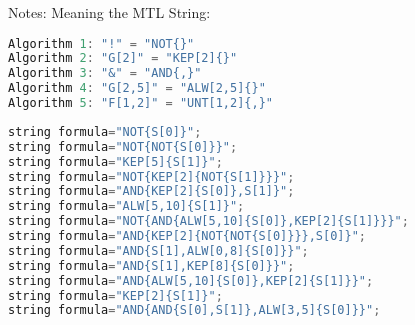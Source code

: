 Notes: Meaning the MTL String:
\begin{lstlisting}[language=C]
Algorithm 1: "!" = "NOT{}"
Algorithm 2: "G[2]" = "KEP[2]{}"
Algorithm 3: "&" = "AND{,}"
Algorithm 4: "G[2,5]" = "ALW[2,5]{}"
Algorithm 5: "F[1,2]" = "UNT[1,2]{,}"
\end{lstlisting}

\begin{lstlisting}[language=C]
string formula="NOT{S[0]}";
string formula="NOT{NOT{S[0]}}";
string formula="KEP[5]{S[1]}";
string formula="NOT{KEP[2]{NOT{S[1]}}}";
string formula="AND{KEP[2]{S[0]},S[1]}";
string formula="ALW[5,10]{S[1]}";
string formula="NOT{AND{ALW[5,10]{S[0]},KEP[2]{S[1]}}}";
string formula="AND{KEP[2]{NOT{NOT{S[0]}}},S[0]}";
string formula="AND{S[1],ALW[0,8]{S[0]}}";
string formula="AND{S[1],KEP[8]{S[0]}}";
string formula="AND{ALW[5,10]{S[0]},KEP[2]{S[1]}}";
string formula="KEP[2]{S[1]}";
string formula="AND{AND{S[0],S[1]},ALW[3,5]{S[0]}}";
\end{lstlisting}

\clearpage
